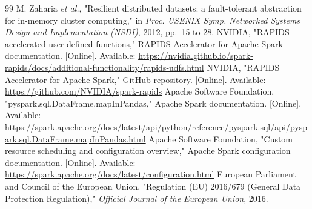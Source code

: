 \begin{thebibliography}{99}
 M. Zaharia \emph{et al.}, "Resilient distributed datasets: a fault-tolerant abstraction for in-memory cluster computing," in \emph{Proc. USENIX Symp. Networked Systems Design and Implementation (NSDI)}, 2012, pp.~15 to 28.
 NVIDIA, "RAPIDS accelerated user-defined functions," RAPIDS Accelerator for Apache Spark documentation. [Online]. Available: \url{https://nvidia.github.io/spark-rapids/docs/additional-functionality/rapids-udfs.html}
 NVIDIA, "RAPIDS Accelerator for Apache Spark," GitHub repository. [Online]. Available: \url{https://github.com/NVIDIA/spark-rapids}
 Apache Software Foundation, "pyspark.sql.DataFrame.mapInPandas," Apache Spark documentation. [Online]. Available: \url{https://spark.apache.org/docs/latest/api/python/reference/pyspark.sql/api/pyspark.sql.DataFrame.mapInPandas.html}
 Apache Software Foundation, "Custom resource scheduling and configuration overview," Apache Spark configuration documentation. [Online]. Available: \url{https://spark.apache.org/docs/latest/configuration.html}
 European Parliament and Council of the European Union, "Regulation (EU) 2016/679 (General Data Protection Regulation)," \emph{Official Journal of the European Union}, 2016.
\end{thebibliography}
